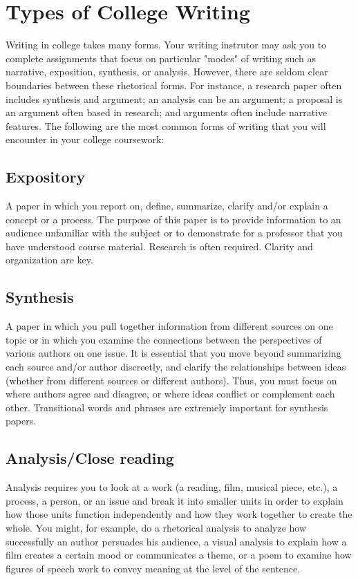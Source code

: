
\chapter{Types of College Writing}

Writing in college takes many forms. Your writing instrutor may ask you to complete 
assignments that focus on particular "modes" of writing such as narrative, exposition, 
synthesis, or analysis. However, there are seldom clear boundaries between these 
rhetorical forms. For instance, a research paper often includes synthesis and argument; 
an analysis can be an argument; a proposal is an argument often based in research; and 
arguments often include narrative features. The following are the most common forms 
of writing that you will encounter in your college coursework:


\section{Expository}
A paper in which you report on, define, summarize, clarify and/or explain a concept or 
a process. The purpose of this paper is to provide information to an audience unfamiliar 
with the subject or to demonstrate for a professor that you have understood course 
material.  Research is often required. Clarity and organization are key.

\section{Synthesis}

A paper in which you pull together information from different sources on one topic or 
in which you examine the connections between the perspectives of various authors on 
one issue. It is essential that you move beyond summarizing each source and/or author 
discreetly, and clarify the relationships between ideas (whether from different sources 
or different authors). Thus, you must focus on where authors agree and disagree, or 
where ideas conflict or complement each other. Transitional words and phrases are 
extremely important for synthesis papers.

\section{Analysis/Close reading}
Analysis requires you to look at a work (a reading, film, musical piece, etc.), a process, 
a person, or an issue and break it into smaller units in order to explain how those units 
function independently and how they work together to create the whole. You might, 
for example, do a rhetorical analysis to analyze how successfully an author persuades his 
audience, a visual analysis to explain how a film creates a certain mood or communicates 
a theme, or a poem to examine how figures of speech work to convey meaning at the 
level of the sentence.

